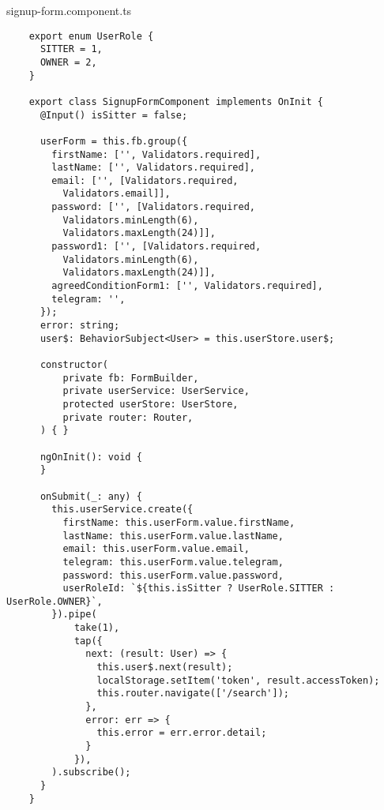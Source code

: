 signup-form.component.ts
\begin{lstlisting}
    export enum UserRole {
      SITTER = 1,
      OWNER = 2,
    }
    
    export class SignupFormComponent implements OnInit {
      @Input() isSitter = false;
    
      userForm = this.fb.group({
        firstName: ['', Validators.required],
        lastName: ['', Validators.required],
        email: ['', [Validators.required,
          Validators.email]],
        password: ['', [Validators.required,
          Validators.minLength(6),
          Validators.maxLength(24)]],
        password1: ['', [Validators.required,
          Validators.minLength(6),
          Validators.maxLength(24)]],
        agreedConditionForm1: ['', Validators.required],
        telegram: '',
      });
      error: string;
      user$: BehaviorSubject<User> = this.userStore.user$;
    
      constructor(
          private fb: FormBuilder,
          private userService: UserService,
          protected userStore: UserStore,
          private router: Router,
      ) { }
    
      ngOnInit(): void {
      }
    
      onSubmit(_: any) {
        this.userService.create({
          firstName: this.userForm.value.firstName,
          lastName: this.userForm.value.lastName,
          email: this.userForm.value.email,
          telegram: this.userForm.value.telegram,
          password: this.userForm.value.password,
          userRoleId: `${this.isSitter ? UserRole.SITTER : UserRole.OWNER}`,
        }).pipe(
            take(1),
            tap({
              next: (result: User) => {
                this.user$.next(result);
                localStorage.setItem('token', result.accessToken);
                this.router.navigate(['/search']);
              },
              error: err => {
                this.error = err.error.detail;
              }
            }),
        ).subscribe();
      }
    }    
\end{lstlisting}


